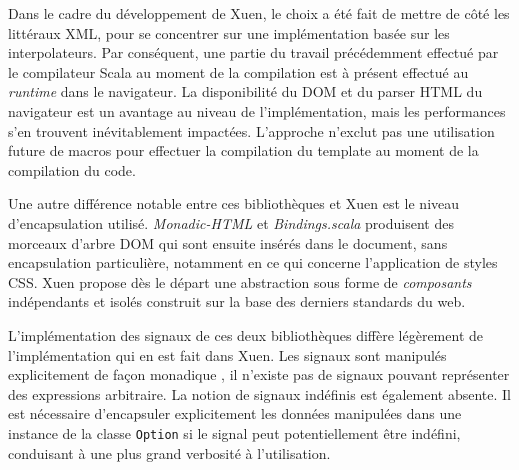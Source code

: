 Dans le cadre du développement de Xuen, le choix a été fait de mettre de côté les littéraux XML, pour se concentrer sur une implémentation basée sur les interpolateurs. Par conséquent, une partie du travail précédemment effectué par le compilateur Scala au moment de la compilation est à présent effectué au \emph{runtime} dans le navigateur. La disponibilité du DOM et du parser HTML du navigateur est un avantage au niveau de l'implémentation, mais les performances s'en trouvent inévitablement impactées. L'approche n'exclut pas une utilisation future de macros pour effectuer la compilation du template au moment de la compilation du code.

Une autre différence notable entre ces bibliothèques et Xuen est le niveau d'encapsulation utilisé.  \emph{Monadic-HTML} et \emph{Bindings.scala} produisent des morceaux d'arbre DOM qui sont ensuite insérés dans le document, sans encapsulation particulière, notamment en ce qui concerne l'application de styles CSS. Xuen propose dès le départ une abstraction sous forme de \emph{composants} indépendants et isolés construit sur la base des derniers standards du web.

L'implémentation des signaux de ces deux bibliothèques diffère légèrement de l'implémentation qui en est fait dans Xuen. Les signaux sont manipulés explicitement de façon monadique , il n'existe pas de signaux pouvant représenter des expressions arbitraire. La notion de signaux indéfinis est également absente. Il est nécessaire d'encapsuler explicitement les données manipulées dans une instance de la classe \texttt{Option} si le signal peut potentiellement être indéfini, conduisant à une plus grand verbosité à l'utilisation.